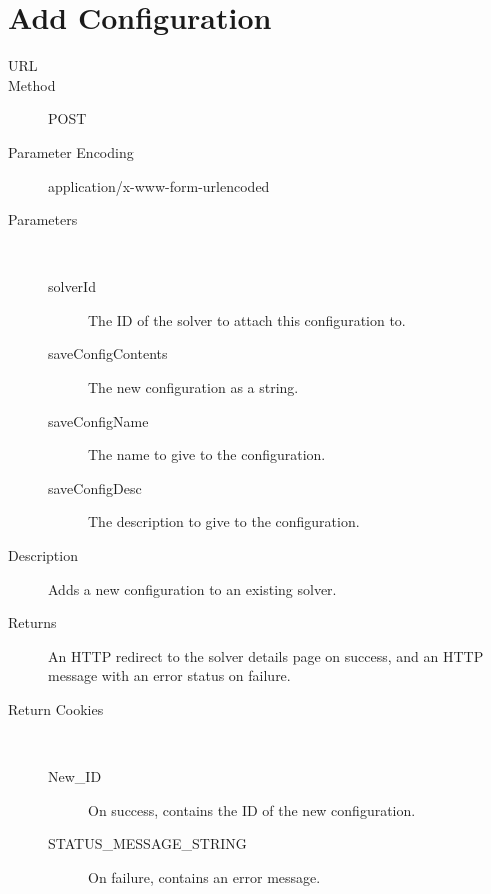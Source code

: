 \section{Add Configuration}
\begin{description}
\item [URL] 
\item [Method] POST
\item [Parameter Encoding] application/x-www-form-urlencoded
\item [Parameters] \
	\begin{description}
	\item [solverId]  The ID of the solver to attach this configuration to.
	\item [saveConfigContents]  The new configuration as a string.
	\item [saveConfigName]  The name to give to the configuration.
	\item [saveConfigDesc] \type{String} The description to give to the configuration.
	\end{description}
\item [Description] Adds a new configuration to an existing solver.
\item [Returns] An HTTP redirect to the solver details page on success, and an HTTP message with an error status on failure.
\item [Return Cookies] \
	\begin{description}
	\item [New\_ID]  On success, contains the ID of the new configuration.
	\item [STATUS\_MESSAGE\_STRING]  On failure, contains an error message.
	\end{description}
\end{description}

